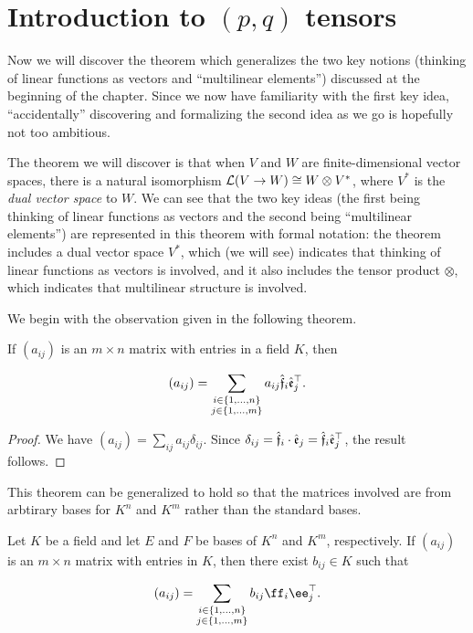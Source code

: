 \newpage

\section{Introduction to $(p, q)$ tensors}
\label{ch::motivated_intro::sec::motivated_intro}

Now we will discover the theorem which generalizes the two key notions (thinking of linear functions as vectors and ``multilinear elements'') discussed at the beginning of the chapter. Since we now have familiarity with the first key idea, ``accidentally'' discovering and formalizing the second idea as we go is hopefully not too ambitious.

The theorem we will discover is that when $V$ and $W$ are finite-dimensional vector spaces, there is a natural isomorphism $\mathcal{L}(V \rightarrow W) \cong W \otimes V^*$, where $V^*$ is the \textit{dual vector space} to $W$. We can see that the two key ideas (the first being thinking of linear functions as vectors and the second being ``multilinear elements'') are represented in this theorem with formal notation: the theorem includes a dual vector space $V^*$, which (we will see) indicates that thinking of linear functions as vectors is involved, and it also includes the tensor product $\otimes$, which indicates that multilinear structure is involved.

We begin with the observation given in the following theorem.

\begin{theorem}
    If $(a_{ij})$ is an $m \times n$ matrix with entries in a field $K$, then

    \begin{align*}
        (a_{ij}) = \sum_{\substack{i \in \{1, ..., n\} \\ j \in \{1, ..., m\}}} a_{ij} \hat{\mathfrak{f}}_i \hat{\mathfrak{e}}_j^\top.
    \end{align*}
\end{theorem}

\begin{proof}
    We have $(a_{ij}) = \sum_{ij} a_{ij} \delta_{ij}$. Since $\delta_{ij} = \hat{\mathfrak{f}}_i \cdot \hat{\mathfrak{e}}_j = \hat{\mathfrak{f}}_i \hat{\mathfrak{e}}_j^\top$, the result follows.
\end{proof}

This theorem can be generalized to hold so that the matrices involved are from arbtirary bases for $K^n$ and $K^m$ rather than the standard bases.

\begin{theorem}
    Let $K$ be a field and let $E$ and $F$ be bases of $K^n$ and $K^m$, respectively. If $(a_{ij})$ is an $m \times n$ matrix with entries in $K$, then there exist $b_{ij} \in K$ such that

   \begin{align*}
        (a_{ij}) = \sum_{\substack{i \in \{1, ..., n\} \\ j \in \{1, ..., m\}}} b_{ij} \ff_i \ee_j^\top.
    \end{align*}
\end{theorem}

